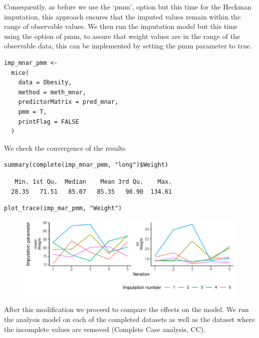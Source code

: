 \documentclass[
  article]{jss}
\begin{document}
Consequently, as before we use the `pmm', option but this time for the
Heckman imputation, this approach ensures that the imputed values remain
within the range of observable values. We then run the imputation model
but this time using the option of pmm, to assure that weight values are
in the range of the observable data, this can be implemented by setting
the pmm parameter to true.

\begin{verbatim}
imp_mnar_pmm <-
  mice(
    data = Obesity,
    method = meth_mnar,
    predictorMatrix = pred_mnar,
    pmm = T,
    printFlag = FALSE
  )
\end{verbatim}

We check the convergence of the results

\begin{verbatim}
summary(complete(imp_mnar_pmm, "long")$Weight)
\end{verbatim}

\begin{verbatim}
   Min. 1st Qu.  Median    Mean 3rd Qu.    Max. 
  28.35   71.51   85.07   85.35   98.90  134.61 
\end{verbatim}

\begin{verbatim}
plot_trace(imp_mar_pmm, "Weight")
\end{verbatim}

\begin{figure}[h]

{\centering \includegraphics{manuscript_files/figure-pdf/obesity-predmnarp1-1.pdf}

}

\end{figure}

After this modification we proceed to compare the effects on the model.
We run the analysis model on each of the completed datasets as well as
the dataset where the incomplete values are removed (Complete Case
analysis, CC).
\end{document}

